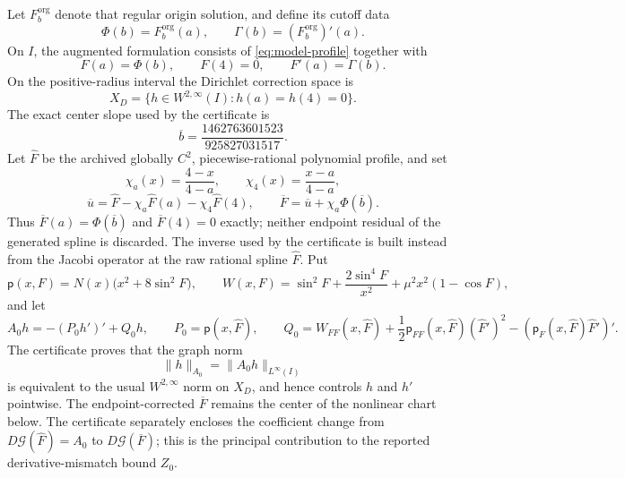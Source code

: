 Let \(F_b^{\mathrm{org}}\) denote that regular origin solution, and define its
cutoff data
\[
  \Phi(b)=F_b^{\mathrm{org}}(a),
  \qquad
  \Gamma(b)=(F_b^{\mathrm{org}})'(a).
\]
On \(I\), the augmented formulation consists of
\eqref{eq:model-profile} together with
\begin{equation}
  F(a)=\Phi(b),
  \qquad
  F(4)=0,
  \qquad
  F'(a)=\Gamma(b).
  \label{eq:model-augmented-boundary}
\end{equation}
On the positive-radius interval the Dirichlet correction space is
\[
  X_D=\{h\in W^{2,\infty}(I):h(a)=h(4)=0\}.
\]
The exact center slope used by the certificate is
\[
  \overline b=\frac{1462763601523}{925827031517}.
\]
Let \(\widehat F\) be the archived globally \(C^2\), piecewise-rational
polynomial profile, and set
\[
  \chi_a(x)=\frac{4-x}{4-a},
  \qquad
  \chi_4(x)=\frac{x-a}{4-a},
\]
\begin{equation}
  \overline u
    =\widehat F-\chi_a\widehat F(a)-\chi_4\widehat F(4),
  \qquad
  \overline F=\overline u+\chi_a\Phi(\overline b).
  \label{eq:model-center}
\end{equation}
Thus \(\overline F(a)=\Phi(\overline b)\) and
\(\overline F(4)=0\) exactly; neither endpoint residual of the generated
spline is discarded.  The inverse used by the certificate is built instead
from the Jacobi operator at the raw rational spline \(\widehat F\).  Put
\[
  \mathsf p(x,F)=N(x)\bigl(x^2+8\sin^2F\bigr),
  \qquad
  W(x,F)=\sin^2F+\frac{2\sin^4F}{x^2}
          +\mu^2x^2(1-\cos F),
\]
and let
\begin{equation}
  A_0h=-(P_0h')'+Q_0h,
  \qquad
  P_0=\mathsf p(x,\widehat F),
  \qquad
  Q_0=W_{FF}(x,\widehat F)
       +\frac12\mathsf p_{FF}(x,\widehat F)(\widehat F')^2
       -(\mathsf p_F(x,\widehat F)\widehat F')'.
  \label{eq:model-jacobi}
\end{equation}
The certificate proves that the graph norm
\[
  \|h\|_{A_0}=\|A_0h\|_{L^\infty(I)}
\]
is equivalent to the usual \(W^{2,\infty}\) norm on \(X_D\), and hence
controls \(h\) and \(h'\) pointwise.  The endpoint-corrected
\(\overline F\) remains the center of the nonlinear chart below.  The
certificate separately encloses the coefficient change from
\(D\mathcal G(\widehat F)=A_0\) to
\(D\mathcal G(\overline F)\); this is the principal contribution to the
reported derivative-mismatch bound \(Z_0\).

